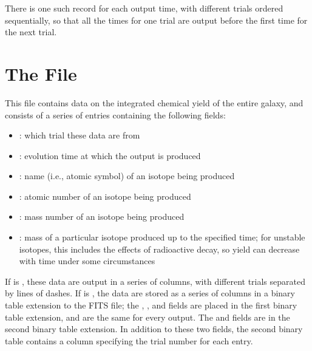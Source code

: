 \documentclass[letterpaper,10pt,english]{sphinxmanual}
\begin{document}
There is one such record for each output time, with different trials ordered sequentially, so that all the times for one trial are output before the first time for the next trial.


\section{The  File}
\label{\detokenize{output:the-integrated-yield-file}}\label{\detokenize{output:ssec-int-yield-file}}
This file contains data on the integrated chemical yield of the entire
galaxy, and consists of a series of entries containing the following
fields:
\begin{itemize}
\item {} 
: which trial these data are from

\item {} 
: evolution time at which the output is produced

\item {} 
: name (i.e., atomic symbol) of an isotope being produced

\item {} 
: atomic number of an isotope being produced

\item {} 
: mass number of an isotope being produced

\item {} 
: mass of a particular isotope produced up to the specified time; for unstable isotopes, this includes the effects of radioactive decay, so yield can decrease with time under some circumstances

\end{itemize}

If  is , these data are output in a series of
columns, with different trials separated by lines of dashes. If
 is , the data are stored as a series of
columns in a binary table extension to the FITS file; the ,
, and  fields are placed in the first binary table
extension, and are the same for every output. The  and
 fields are in the second binary table extension. In
addition to these two fields, the second binary table contains a
column specifying the trial number for each entry.
\end{document}
